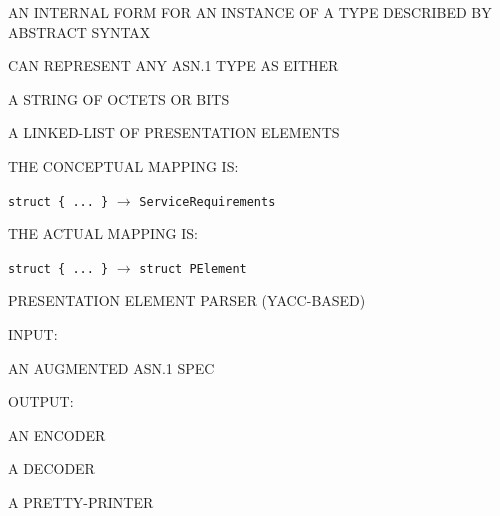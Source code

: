 \begin{bwslide}

\begin{nrtc}
\item	AN INTERNAL FORM FOR AN INSTANCE OF A TYPE DESCRIBED BY ABSTRACT
	SYNTAX

\item	CAN REPRESENT ANY ASN.1 TYPE AS EITHER
    \begin{nrtc}
    \item	A STRING OF OCTETS OR BITS

    \item	A LINKED-LIST OF PRESENTATION ELEMENTS
    \end{nrtc}

\item	THE CONCEPTUAL MAPPING IS:
    \begin{nrtc}
    \item	\verb"struct { ... }" $\rightarrow$ \verb"ServiceRequirements"
    \end{nrtc}

\item	THE ACTUAL MAPPING IS:
    \begin{nrtc}
    \item	\verb"struct { ... }" $\rightarrow$ \verb"struct PElement"
    \end{nrtc}
\end{nrtc}
\end{bwslide}


\begin{bwslide}

\begin{nrtc}
\item	PRESENTATION ELEMENT PARSER (YACC-BASED)

\item	INPUT:
    \begin{nrtc}
    \item	AN AUGMENTED ASN.1 SPEC
    \end{nrtc}

\item	OUTPUT:
    \begin{nrtc}
    \item	AN ENCODER

    \item	A DECODER

    \item	A PRETTY-PRINTER
    \end{nrtc}
\end{nrtc}
\end{bwslide}


